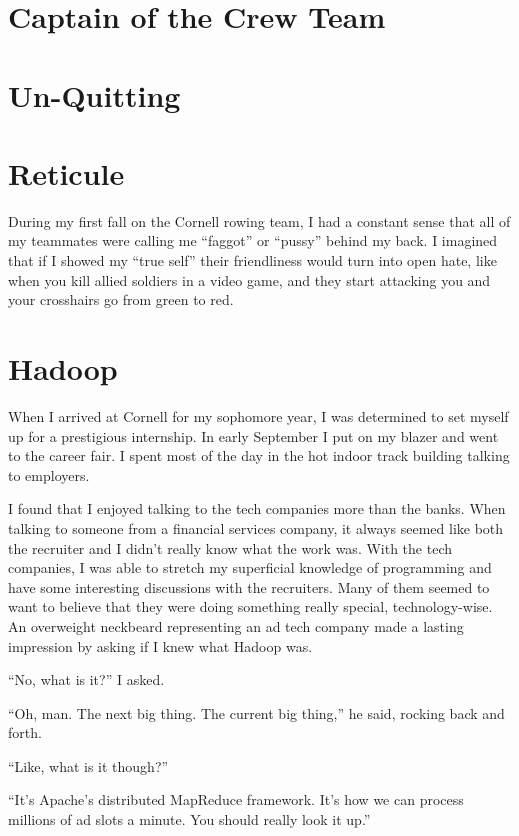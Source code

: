 \documentclass[12pt]{article}
\begin{document}
\section{Captain of the Crew Team}


\section{Un-Quitting}


\section{Reticule}
During my first fall on the Cornell rowing team, I had a constant sense that
all of my teammates were calling me ``faggot'' or ``pussy'' behind my back.  I
imagined that if I showed my ``true self'' their friendliness would turn into
open hate, like when you kill allied soldiers in a video game, and they start
attacking you and your crosshairs go from green to red.  


\section{Hadoop}
When I arrived at Cornell for my sophomore year, I was determined to set myself
up for a prestigious internship.  In early September I put on my blazer and went
to the career fair.  I spent most of the day in the hot indoor track building
talking to employers. 

I found that I enjoyed talking to the tech companies more than the banks.  When
talking to someone from a financial services company, it always seemed like both
the recruiter and I didn't really know what the work was.  With the tech
companies, I was able to stretch my superficial knowledge of programming and
have some interesting discussions with the recruiters.  Many of them seemed to
want to believe that they were doing something really special, technology-wise.
An overweight neckbeard representing an ad tech company made a lasting impression 
by asking if I knew what Hadoop was.  

``No, what is it?'' I asked.

``Oh, man.  The next big thing.  The current big thing,'' he said,
rocking back and forth.

``Like, what is it though?''

``It's Apache's distributed MapReduce framework.  It's how we can process
millions of ad slots a minute.  You should really look it up.''
\end{document}
